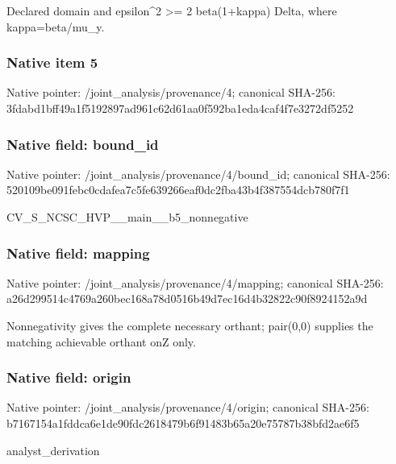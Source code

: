 \documentclass[10pt,a4paper]{article}
\begin{document}
\begingroup\raggedright\sloppy Declared domain and epsilon\textasciicircum{}2 >=\allowbreak{} 2 beta(1+kappa) Delta,\allowbreak{} where kappa=\allowbreak{}beta/\allowbreak{}mu\_\allowbreak{}y.\par\endgroup

\subsubsection{Native item 5}
Native pointer: /joint\_\allowbreak{}analysis/provenance/4; canonical SHA-256: 3fdabd1bff49a1f5192897ad961c62d61aa0f592ba1eda4caf4f7e3272df5252

\subsubsection{Native field: bound\_\allowbreak{}id}
Native pointer: /joint\_\allowbreak{}analysis/provenance/4/bound\_\allowbreak{}id; canonical SHA-256: 520109be091febc0cdafea7c5fe639266eaf0dc2fba43b4f387554dcb780f7f1

\begingroup\raggedright\sloppy CV\_\allowbreak{}S\_\allowbreak{}NCSC\_\allowbreak{}HVP\_\allowbreak{}\_\allowbreak{}main\_\allowbreak{}\_\allowbreak{}b5\_\allowbreak{}nonnegative\par\endgroup

\subsubsection{Native field: mapping}
Native pointer: /joint\_\allowbreak{}analysis/provenance/4/mapping; canonical SHA-256: a26d299514c4769a260bec168a78d0516b49d7ec16d4b32822c90f8924152a9d

\begingroup\raggedright\sloppy Nonnegativity gives the complete necessary orthant;\allowbreak{} pair(0,\allowbreak{}0) supplies the matching achievable orthant onZ only.\par\endgroup

\subsubsection{Native field: origin}
Native pointer: /joint\_\allowbreak{}analysis/provenance/4/origin; canonical SHA-256: b7167154a1fddca6e1de90fdc2618479b6f91483b65a20e75787b38bfd2ae6f5

\begingroup\raggedright\sloppy analyst\_\allowbreak{}derivation\par\endgroup
\end{document}
